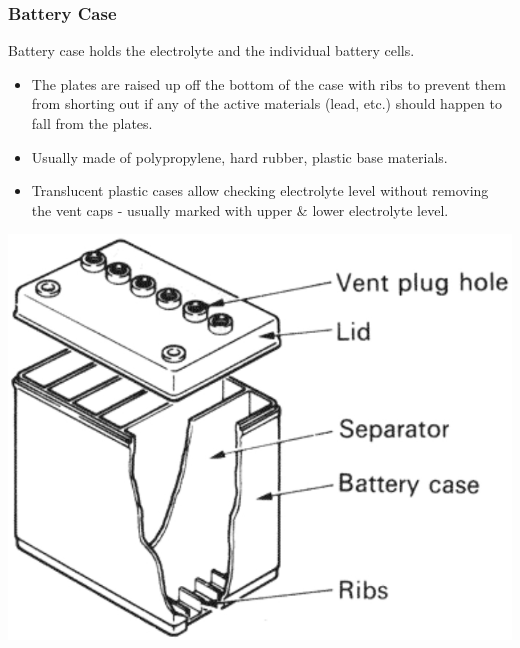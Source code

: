 \documentclass{beamer}
\begin{document}
\begin{frame}    %
  \frametitle{Battery Case}
  \fontsize{7pt}{10}\selectfont
  
  \begin{center}
    Battery case holds the electrolyte and the individual battery cells. 
  \end{center}
  
  \begin{itemize}
    \item The plates are raised up off the bottom of the case with ribs to prevent them from shorting out if any of the active materials (lead, etc.) should happen to fall from the plates.
    \item Usually made of polypropylene, hard rubber, plastic base materials.
    \item Translucent plastic cases allow checking electrolyte level without removing the vent caps - usually marked with upper \& lower electrolyte level.
  \end{itemize}
  
  \begin{center}
    \includegraphics[width=0.5\linewidth]{./Resources/Images/battery_case.jpg}
  \end{center}
  
\end{frame}
\end{document}
